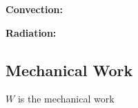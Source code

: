 \textbf{Convection:}

\textbf{Radiation:}



\subsection{Mechanical Work}

{\color{orange}$W$} is the mechanical work%
%
%
%    
%
%
%
%
